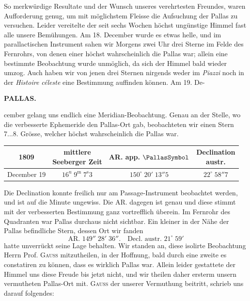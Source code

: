 \par\indent So merkwürdige Resultate und der Wunsch unseres verehrtesten Freundes, waren Aufforderung genug, um mit möglichstem Fleisse die Aufsuchung der Pallas zu versuchen. Leider vereitelte der seit sechs Wochen höchst ungünstige Himmel fast alle unsere Bemühungen. Am 18. December wurde es etwas helle, und im parallactischen Instrument sahen wir Morgens zwei Uhr drei Sterne im Felde des Fernrohrs, von denen einer höchst wahrscheinlich die Pallas war; allein eine bestimmte Beobachtung wurde unmöglich, da sich der Himmel bald wieder umzog. Auch haben wir von jenen drei Sternen nirgends weder im \emph{Piazzi} noch in der \emph{Histoire céleste} eine Bestimmung auffinden können. Am 19. De-\par
{}
\clearpage
\thispagestyle{empty}
\noindent{}%
%
\parbox[t]{\dimexpr\linewidth-24mm\relax}{\centering\footnotesize\bfseries PALLAS.\par}%
\makebox[12mm][r]{}\par\nobreak\medskip
\noindent cember gelang uns endlich eine Meridian-Beobachtung. Genau an der Stelle, wo die verbesserte Ephemeride den Pallas-Ort gab, beobachteten wir einen Stern 7...8. Grösse, welcher höchst wahrscheinlich die Pallas war.

\begin{center}\fontsize{10}{12}\selectfont\setlength{\tabcolsep}{4pt}\renewcommand{\arraystretch}{1.15}\begin{tabular}{c|c|c|c}
1809 & \shortstack{mittlere\\Seeberger Zeit} & AR. app. $\PallasSymbol$ & \shortstack{Declination\\austr.}\\\hline
December 19 & $16^{\text{u}}\;9^{\text{m}}\;7^{\text{s}}3$ & $150^\circ\;20'\;13''5$ & $22^\circ\;58''7$\\
\end{tabular}\end{center}

\par\indent Die Declination konnte freilich nur am Passage-Instrument beobachtet werden, und ist auf die Minute ungewiss. Die AR. dagegen ist genau und diese stimmt mit der verbesserten Bestimmung ganz vortrefflich überein. Im Fernrohr des Quadranten war Pallas durchaus nicht sichtbar. Ein kleiner in der Nähe der Pallas befindliche Stern, dessen Ort wir fanden
\[\text{AR. }149''\;28'\;36''.\quad\text{Decl. austr. }21^\circ\;59'\]
\noindent hatte unverrückt seine Lage behalten. Wir standen an, diese isolirte Beobachtung Herrn Prof. \textsc{Gauss} mitzutheilen, in der Hoffnung, bald durch eine zweite es constatiren zu können, dass es wirklich Pallas war. Allein leider gestattete der Himmel uns diese Freude bis jetzt nicht, und wir theilen daher ersterm unsern vermutheten Pallas-Ort mit. \textsc{Gauss} der unserer Vermuthung beitritt, schrieb uns darauf folgendes:

